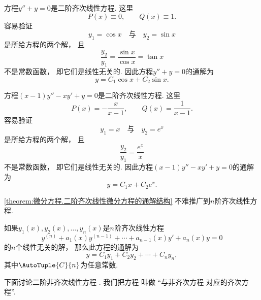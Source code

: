 \begin{example}
方程\(y'' + y = 0\)是二阶齐次线性方程.
这里\[
	P(x)\equiv0,
	\qquad
	Q(x)\equiv1.
\]
容易验证\[
	y_1 = \cos x
	\quad\text{与}\quad
	y_2 = \sin x
\]
是所给方程的两个解，
且\[
	\frac{y_2}{y_1}
	= \frac{\sin x}{\cos x}
	= \tan x
\]不是常数函数，
即它们是线性无关的.
因此方程\(y'' + y = 0\)的通解为\[
	y = C_1 \cos x + C_2 \sin x.
\]
\end{example}
\begin{example}
方程\((x-1) y'' - x y' + y = 0\)是二阶齐次线性方程.
这里\[
	P(x)=-\frac{x}{x-1},
	\qquad
	Q(x)=\frac1{x-1}.
\]
容易验证\[
	y_1 = x
	\quad\text{与}\quad
	y_2 = e^x
\]是所给方程的两个解，
且\[
	\frac{y_2}{y_1}
	= \frac{e^x}{x}
\]不是常数函数，
即它们是线性无关的.
因此方程\((x-1) y'' - x y' + y = 0\)的通解为\[
	y = C_1 x + C_2 e^x.
\]
\end{example}

\cref{theorem:微分方程.二阶齐次线性微分方程的通解结构} 不难推广到\(n\)阶齐次线性方程.
\begin{corollary}\label{theorem:微分方程.n阶齐次线性微分方程的通解结构}
如果\(y_1(x),y_2(x),\dotsc,y_n(x)\)是\(n\)阶齐次线性方程\[
	y^{(n)} + a_1(x) y^{(n-1)} + \dotsb + a_{n-1}(x) y' + a_n(x) y = 0
\]的\(n\)个线性无关的解，
那么此方程的通解为\[
	y = C_1 y_1 + C_2 y_2 + \dotsb + C_n y_n,
\]
其中\(\AutoTuple{C}{n}\)为任意常数.
\end{corollary}

下面讨论二阶非齐次线性方程 .
我们把方程  叫做%
“与非齐次方程  对应的齐次方程”.


